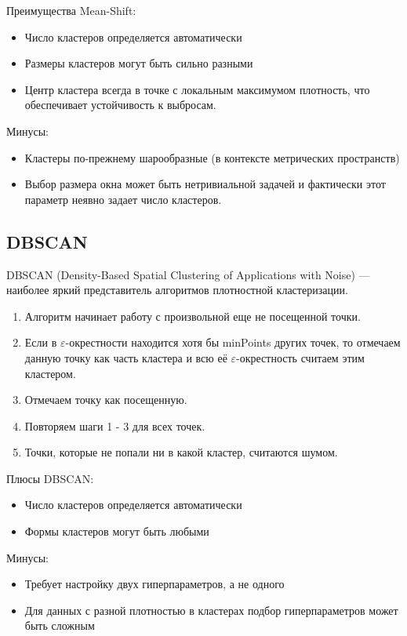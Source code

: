 Преимущества Mean-Shift:
\begin{itemize}
    \item Число кластеров определяется автоматически
    \item Размеры кластеров могут быть сильно разными
    \item Центр кластера всегда в точке с локальным максимумом плотность, что обеспечивает устойчивость к выбросам.
\end{itemize}

Минусы:
\begin{itemize}
    \item Кластеры по-прежнему шарообразные (в контексте метрических пространств)
    \item Выбор размера окна может быть нетривиальной задачей и фактически этот параметр неявно задает число кластеров.
\end{itemize}

\subsection{DBSCAN}

\begin{definition}
    DBSCAN (Density-Based Spatial Clustering of Applications with Noise) --- наиболее яркий представитель алгоритмов плотностной кластеризации.
    \begin{enumerate}
        \item Алгоритм начинает работу с произвольной еще не посещенной точки.
        \item Если в $\varepsilon$-окрестности находится хотя бы minPoints других точек, то отмечаем данную точку как часть кластера и всю её $\varepsilon$-окрестность считаем этим кластером.
        \item Отмечаем точку как посещенную.
        \item Повторяем шаги 1 - 3 для всех точек.
        \item Точки, которые не попали ни в какой кластер, считаются шумом.
    \end{enumerate}
\end{definition}

Плюсы DBSCAN:
\begin{itemize}
    \item Число кластеров определяется автоматически
    \item Формы кластеров могут быть любыми
\end{itemize}

Минусы:
\begin{itemize}
    \item Требует настройку двух гиперпараметров, а не одного
    \item Для данных с разной плотностью в кластерах подбор гиперпараметров может быть сложным
\end{itemize}


